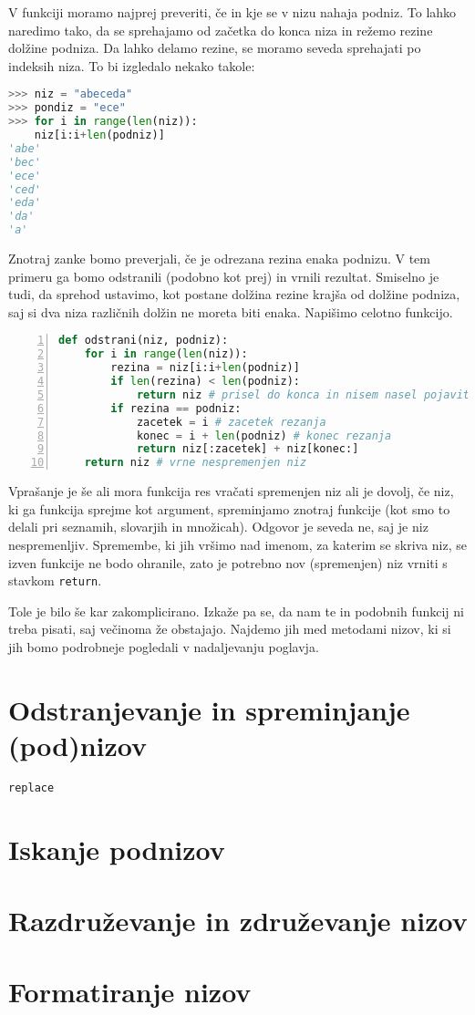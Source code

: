 \begin{resitev}
V funkciji moramo najprej preveriti, če in kje se v nizu nahaja podniz. To lahko naredimo tako, da se sprehajamo od začetka do konca niza in režemo rezine dolžine podniza. Da lahko delamo rezine, se moramo seveda sprehajati po indeksih niza. To bi izgledalo nekako takole:
\begin{lstlisting}[language=Python]
>>> niz = "abeceda"
>>> pondiz = "ece"
>>> for i in range(len(niz)):
	niz[i:i+len(podniz)]
'abe'
'bec'
'ece'
'ced'
'eda'
'da'
'a'
\end{lstlisting}
Znotraj zanke bomo preverjali, če je odrezana rezina enaka podnizu. V tem primeru ga bomo odstranili (podobno kot prej) in vrnili rezultat. Smiselno je tudi, da sprehod ustavimo, kot postane dolžina rezine krajša od dolžine podniza, saj si dva niza različnih dolžin ne moreta biti enaka. Napišimo celotno funkcijo.
\begin{lstlisting}[language=Python,numbers=left]
def odstrani(niz, podniz):
    for i in range(len(niz)):
        rezina = niz[i:i+len(podniz)]
        if len(rezina) < len(podniz):
            return niz # prisel do konca in nisem nasel pojavitve
        if rezina == podniz:
            zacetek = i # zacetek rezanja
            konec = i + len(podniz) # konec rezanja
            return niz[:zacetek] + niz[konec:]
    return niz # vrne nespremenjen niz
\end{lstlisting}
Vprašanje je še ali mora funkcija res vračati spremenjen niz ali je dovolj, če niz, ki ga funkcija sprejme kot argument, spreminjamo znotraj funkcije (kot smo to delali pri seznamih, slovarjih in množicah). Odgovor je seveda ne, saj je niz nespremenljiv. Spremembe, ki jih vršimo nad imenom, za katerim se skriva niz, se izven funkcije ne bodo ohranile, zato je potrebno nov (spremenjen) niz vrniti s stavkom \texttt{return}. 
\end{resitev}

Tole je bilo še kar zakomplicirano. Izkaže pa se, da nam te in podobnih funkcij ni treba pisati, saj večinoma že obstajajo. Najdemo jih med metodami nizov, ki si jih bomo podrobneje pogledali v nadaljevanju poglavja.

\section{Odstranjevanje in spreminjanje (pod)nizov}
\texttt{replace}


\section{Iskanje podnizov}

\section{Razdruževanje in združevanje nizov}

\section{Formatiranje nizov}

